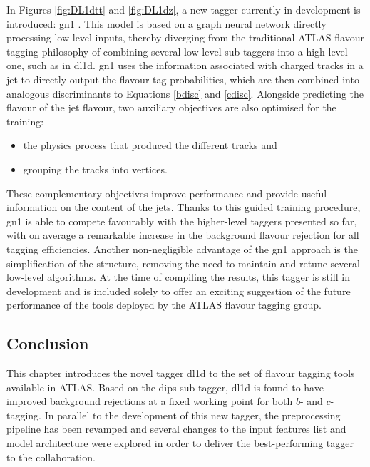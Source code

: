 In Figures \ref{fig:DL1dtt} and \ref{fig:DL1dz}, a new tagger currently in development is introduced: \gls{gn1} \cite{ATL-PHYS-PUB-2022-027}. This model is based on a graph neural network directly processing low-level inputs, thereby diverging from the traditional ATLAS flavour tagging philosophy of combining several low-level sub-taggers into a high-level one, such as in \gls{dl1d}. \gls{gn1} uses the information associated with charged tracks in a jet to directly output the flavour-tag probabilities, which are then combined into analogous discriminants to Equations \ref{bdisc} and \ref{cdisc}. Alongside predicting the flavour of the jet flavour, two auxiliary objectives are also optimised for the training: 
\begin{itemize}
\item the physics process that produced the different tracks and
\item grouping the tracks into vertices.
\end{itemize}
These complementary objectives improve performance and provide useful information on the content of the jets. Thanks to this guided training procedure, \gls{gn1} is able to compete favourably with the higher-level taggers presented so far, with on average a remarkable increase in the background flavour rejection for all tagging efficiencies. Another non-negligible advantage of the \gls{gn1} approach is the simplification of the structure, removing the need to maintain and retune several low-level algorithms. At the time of compiling the results, this tagger is still in development and is included solely to offer an exciting suggestion of the future performance of the tools deployed by the ATLAS flavour tagging group. 

\subsection{Conclusion}
This chapter introduces the novel tagger \gls{dl1d} to the set of flavour tagging tools available in ATLAS. Based on the \gls{dips} sub-tagger, \gls{dl1d} is found to have improved background rejections at a fixed working point for both $b$- and $c$-tagging. In parallel to the development of this new tagger, the preprocessing pipeline has been revamped and several changes to the input features list and model architecture were explored in order to deliver the best-performing tagger to the collaboration. 
\clearpage
